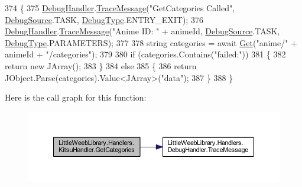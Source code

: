 \begin{DoxyCode}
374         \{
375             \mbox{\hyperlink{class_little_weeb_library_1_1_handlers_1_1_kitsu_handler_a6d3c55fa5eee15320845c2d902c96882}{DebugHandler}}.\mbox{\hyperlink{interface_little_weeb_library_1_1_handlers_1_1_i_debug_handler_a2e405bc3492e683cd3702fae125221bc}{TraceMessage}}(\textcolor{stringliteral}{"GetCategories Called"}, 
      \mbox{\hyperlink{namespace_little_weeb_library_1_1_handlers_a2a6ca0775121c9c503d58aa254d292be}{DebugSource}}.TASK, \mbox{\hyperlink{namespace_little_weeb_library_1_1_handlers_ab66019ed40462876ec4e61bb3ccb0a62}{DebugType}}.ENTRY\_EXIT);
376             \mbox{\hyperlink{class_little_weeb_library_1_1_handlers_1_1_kitsu_handler_a6d3c55fa5eee15320845c2d902c96882}{DebugHandler}}.\mbox{\hyperlink{interface_little_weeb_library_1_1_handlers_1_1_i_debug_handler_a2e405bc3492e683cd3702fae125221bc}{TraceMessage}}(\textcolor{stringliteral}{"Anime ID: "} + animeId, 
      \mbox{\hyperlink{namespace_little_weeb_library_1_1_handlers_a2a6ca0775121c9c503d58aa254d292be}{DebugSource}}.TASK, \mbox{\hyperlink{namespace_little_weeb_library_1_1_handlers_ab66019ed40462876ec4e61bb3ccb0a62}{DebugType}}.PARAMETERS);
377 
378             \textcolor{keywordtype}{string} categories = await \mbox{\hyperlink{class_little_weeb_library_1_1_handlers_1_1_kitsu_handler_a8b7c629a03096c3152252f6b5cf2937f}{Get}}(\textcolor{stringliteral}{"anime/"} + animeId + \textcolor{stringliteral}{"/categories"});
379 
380             \textcolor{keywordflow}{if} (categories.Contains(\textcolor{stringliteral}{"failed:"}))
381             \{
382                 \textcolor{keywordflow}{return} \textcolor{keyword}{new} JArray();
383             \}
384             \textcolor{keywordflow}{else}
385             \{
386                 \textcolor{keywordflow}{return} JObject.Parse(categories).Value<JArray>(\textcolor{stringliteral}{"data"});
387             \}
388         \}
\end{DoxyCode}
Here is the call graph for this function\+:\nopagebreak
\begin{figure}[H]
\begin{center}
\leavevmode
\includegraphics[width=350pt]{class_little_weeb_library_1_1_handlers_1_1_kitsu_handler_a8d6a49dd26f66dd33ea2e2b4e9b330cb_cgraph}
\end{center}
\end{figure}
\mbox{\label{class_little_weeb_library_1_1_handlers_1_1_kitsu_handler_a3129d77267b0fb879e3f8f1a8e83494a}} 

